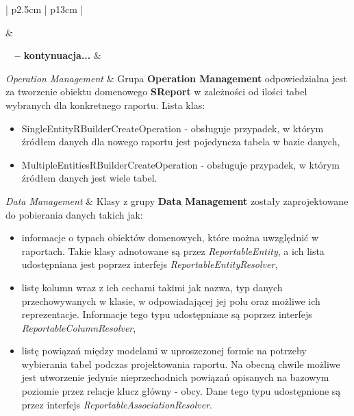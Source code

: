 	\begin{center}
		\begin{longtable}{| p{2.5cm} | p{13cm} |}
			\caption[Bloki funkcjonalne modelu serwisów \textbf{RBuilder}]{
				Bloki funkcjonalne modelu serwisów \textbf{RBuilder}			
			}
			\label{app:rbuilder_services_functionality_table}
			\tabularnewline	
			
			\hline
				 &
				 \tabularnewline
			\hline
			\endfirsthead
			
			{{\bfseries \tablename\ \thetable{} -- kontynuacja...}} \tabularnewline
			\hline
				 &
				 \tabularnewline
			\hline
			\endhead
				
			\hline
				 \tabularnewline \hline
			\endfoot
			\hline
			\endlastfoot	
			
			\emph{Operation Management} 									& 
			Grupa \textbf{Operation Management} odpowiedzialna jest za tworzenie obiektu domenowego \textbf{SReport} w zależności
			od ilości tabel wybranych dla konkretnego raportu. Lista klas:
			\begin{itemize}
				\item SingleEntityRBuilderCreateOperation - obsługuje przypadek, w którym źródłem danych dla nowego raportu jest pojedyncza tabela w bazie danych,
				\item MultipleEntitiesRBuilderCreateOperation - obsługuje przypadek, w którym źródłem danych jest wiele tabel.
			\end{itemize}	
			\tabularnewline				
			\hline
			
			\emph{Data Management}											&
			Klasy z grupy \textbf{Data Management} zostały zaprojektowane do pobierania danych takich jak:
			\begin{itemize}
				\item informacje o typach obiektów domenowych, które można uwzględnić w raportach. Takie klasy adnotowane są 
				przez \emph{\@{}ReportableEntity}, a ich lista udostępniana jest poprzez interfejs \emph{ReportableEntityResolver},
				\item listę kolumn wraz z ich cechami takimi jak nazwa, typ danych przechowywanych w klasie, w odpowiadającej jej polu oraz możliwe ich reprezentacje. Informacje tego typu udostępniane są poprzez interfejs \emph{ReportableColumnResolver},
				\item listę powiązań między modelami w uproszczonej formie na potrzeby wybierania tabel podczas projektowania raportu. 
				Na obecną chwile możliwe jest utworzenie jedynie nieprzechodnich powiązań opisanych na bazowym poziomie przez relacje
				klucz główny - obcy. Dane tego typu udostępnione są przez interfejs \emph{ReportableAssociationResolver}. 
			\end{itemize}
			\hline
			

\end{longtable}
\end{center}
